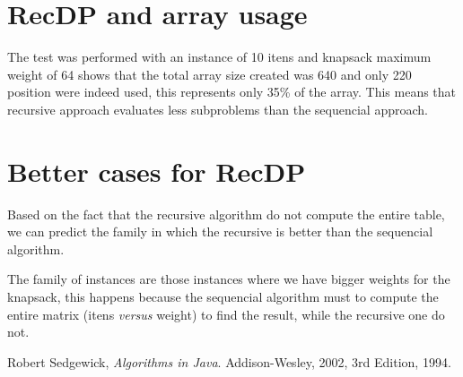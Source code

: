 \documentclass{article}
\begin{document}
\section{RecDP and array usage}

The test was performed with an instance of 10 itens and knapsack maximum weight of 64 shows that the total array size created was
640 and only 220 position were indeed used, this represents only 35\% of the array. This means that recursive approach evaluates
less subproblems than the sequencial approach.

\section{Better cases for RecDP}

Based on the fact that the recursive algorithm do not compute the entire table, we can predict the family in which the recursive is better
than the sequencial algorithm. 

The family of instances are those instances where we have bigger weights for the knapsack, this happens
because the sequencial algorithm must to compute the entire matrix (itens \textit{versus} weight) to find the result, while the recursive one
do not.

\begin{thebibliography}{9}

  Robert Sedgewick,
  \emph{Algorithms in Java}.
  Addison-Wesley, 2002,
  3rd Edition,
  1994.

\end{thebibliography}
\end{document}
